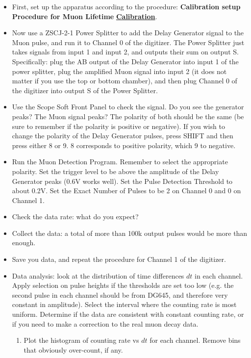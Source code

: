 \documentclass{../lab}
\begin{document}
\begin{enumerate}
    \begin{itemize}
        \item First, set up the apparatus according to the procedure: \textbf{Calibration setup Procedure for Muon Lifetime} \href{http://experimentationlab.berkeley.edu/node/91}{\textbf{Calibration}}.

        \item Now use a ZSCJ-2-1 Power Splitter to add the Delay Generator signal to the Muon pulse, and run it to Channel 0 of the digitizer. The Power Splitter just takes signals from input 1 and input 2, and outputs their sum on output S. Specifically: plug the AB output of the Delay Generator into input 1 of the power splitter, plug the amplified Muon signal into input 2 (it does not matter if you use the top or bottom chamber), and then plug Channel 0 of the digitizer into output S of the Power Splitter.

        \item Use the Scope Soft Front Panel to check the signal. Do you see the generator peaks? The Muon signal peaks? The polarity of both should be the same (be sure to remember if the polarity is positive or negative). If you wish to change the polarity of the Delay Generator pulses, press SHIFT and then press either 8 or 9. 8 corresponds to positive polarity, which 9 to negative.

        \item Run the Muon Detection Program. Remember to select the appropriate polarity. Set the trigger level to be above the amplitude of the Delay Generator peaks (0.6V works well). Set the Pulse Detection Threshold to about 0.2V. Set the Exact Number of Pulses to be 2 on Channel 0 and 0 on Channel 1.

        \item Check the data rate: what do you expect?

        \item Collect the data: a total of more than 100k output pulses would be more than enough.

        \item Save you data, and repeat the procedure for Channel 1 of the digitizer.

        \item Data analysis: look at the distribution of time differences $dt$ in each channel. Apply selection on pulse heights if the thresholds are set too low (e.g. the second pulse in each channel should be from DG645, and therefore very constant in amplitude). Select the interval where the counting rate is most uniform. Determine if the data are consistent with constant counting rate, or if you need to make a correction to the real muon decay data.
        \begin{enumerate}
            \item Plot the histogram of counting rate vs $dt$ for each channel. Remove bins that obviously over-count, if any.
    

\end{enumerate}
\end{itemize}
\end{enumerate}
\end{document}
